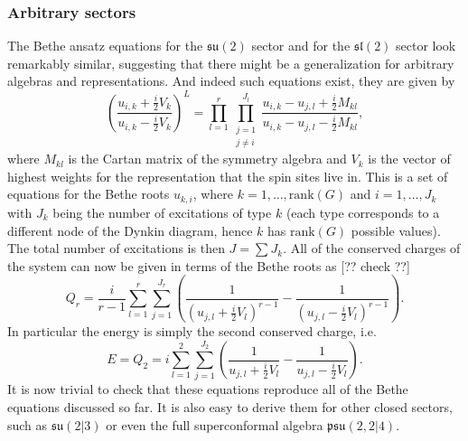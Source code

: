 \subsubsection{Arbitrary sectors}

The Bethe ansatz equations for the $\mathfrak{su}(2)$ sector  and for the $\mathfrak{sl}(2)$ sector  look remarkably similar, suggesting that there might be a generalization for arbitrary algebras and representations.
And indeed such equations exist, they are given by 
\begin{equation}
	\left( \frac{u_{i,k} + \frac{i}{2} V_{k}}{u_{i,k} - \frac{i}{2} V_{k}} \right)^L = \prod_{l=1}^r \prod_{\substack{j=1 \\ j \neq i}}^{J_l} \frac{u_{i,k} - u_{j,l} + \frac{i}{2} M_{kl}}{u_{i,k} - u_{j,l} - \frac{i}{2} M_{kl}},
	\label{eq:general_bae}
\end{equation}
where $M_{kl}$ is the Cartan matrix of the symmetry algebra and $V_{k}$ is the vector of highest weights for the representation that the spin sites live in. This is a set of equations for the Bethe roots $u_{k,i}$, where $k=1,\dots,\mathrm{rank}(G)$ and $i = 1,\dots,J_{k}$ with $J_k$ being the number of excitations of type $k$ (each type corresponds to a different node of the Dynkin diagram, hence $k$ has $\mathrm{rank}(G)$ possible values). The total number of excitations is then $J = \sum J_k$. All of the conserved charges of the system can now be given in terms of the Bethe roots as [?? check ??]
\begin{equation}
	Q_r = \frac{i}{r-1} \sum_{l=1}^{r} \sum_{j=1}^{J_r} \left( \frac{1}{\left(u_{j,l} + \frac{i}{2} V_{l}\right)^{r-1}} - \frac{1}{\left(u_{j,l} - \frac{i}{2} V_{l}\right)^{r-1}} \right).
\end{equation} 
In particular the energy is simply the second conserved charge, i.e.
\begin{equation}
	E = Q_2 = i \sum_{l=1}^{2} \sum_{j=1}^{J_2} \left( \frac{1}{u_{j,l} + \frac{i}{2} V_{l}} - \frac{1}{u_{j,l} - \frac{i}{2} V_{l}} \right).
\end{equation}
It is now trivial to check that these equations reproduce all of the Bethe equations discussed so far. 
It is also easy to derive them for other closed sectors, such as  $\mathfrak{su}(2|3)$ or even the full superconformal algebra $\mathfrak{psu}(2,2|4)$.


